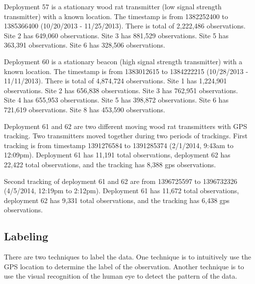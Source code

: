\documentclass[twoside]{article}
\begin{document}
\begin{compactitem}
\item Deployment 57 is a stationary wood rat transmitter (low signal strength transmitter) with a known location. The timestamp is from 1382252400 to 1385366400 (10/20/2013 - 11/25/2013). There is total of 2,222,486 observations. Site 2 has 649,060 observations. Site 3 has 881,529 observations. Site 5 has 363,391 observations. Site 6 has 328,506 observations.
\item Deployment 60 is a stationary beacon (high signal strength transmitter) with a known location. The timestamp is from 1383012615 to 1384222215 (10/28/2013 - 11/11/2013). There is total of 4,874,724 observations. Site 1 has 1,224,901 observations. Site 2 has 656,838 observations. Site 3 has 762,951 observations. Site 4 has 655,953 observations. Site 5 has 398,872 observations. Site 6 has 721,619 observations. Site 8 has 453,590 observations.
\item Deployment 61 and 62 are two different moving wood rat transmitters with GPS tracking. Two transmitters moved together during two periods of trackings. First tracking is from timestamp 1391276584 to 1391285374 (2/1/2014, 9:43am to 12:09pm). Deployment 61 has 11,191 total observations, deployment 62 has 22,422 total observations, and the tracking has 8,388 gps observations. 
\item Second tracking of deployment 61 and 62 are from 1396725597 to 1396732326 (4/5/2014, 12:19pm to 2:12pm). Deployment 61 has 11,672 total observations, deployment 62 has 9,331 total observations, and the tracking has 6,438 gps observations.

\end{compactitem}

\subsection{Labeling}
There are two techniques to label the data. One technique is to intuitively use the GPS location to determine the label of the observation. Another technique is to use the visual recognition of the human eye to detect the pattern of the data.
\end{document}
